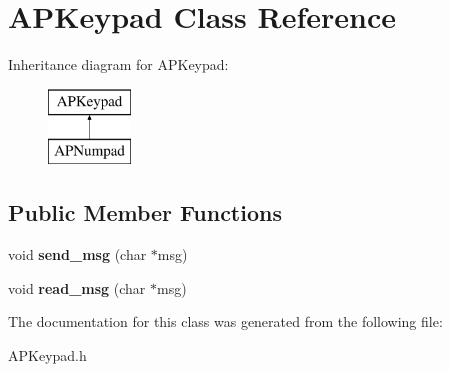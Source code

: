 \hypertarget{class_a_p_keypad}{\section{A\-P\-Keypad Class Reference}
\label{class_a_p_keypad}
}
Inheritance diagram for A\-P\-Keypad\-:\begin{figure}[H]
\begin{center}
\leavevmode
\includegraphics[height=2.000000cm]{class_a_p_keypad}
\end{center}
\end{figure}
\subsection*{Public Member Functions}
\begin{DoxyCompactItemize}
\item 
\hypertarget{class_a_p_keypad_a26e154a988dcf1b8ca5b39a2b6727af2}{void {\bfseries send\-\_\-msg} (char $\ast$msg)}\label{class_a_p_keypad_a26e154a988dcf1b8ca5b39a2b6727af2}

\item 
\hypertarget{class_a_p_keypad_ad46e3f97536b5b90556cba4de9485bab}{void {\bfseries read\-\_\-msg} (char $\ast$msg)}\label{class_a_p_keypad_ad46e3f97536b5b90556cba4de9485bab}

\end{DoxyCompactItemize}


The documentation for this class was generated from the following file\-:\begin{DoxyCompactItemize}
\item 
A\-P\-Keypad.\-h\end{DoxyCompactItemize}
